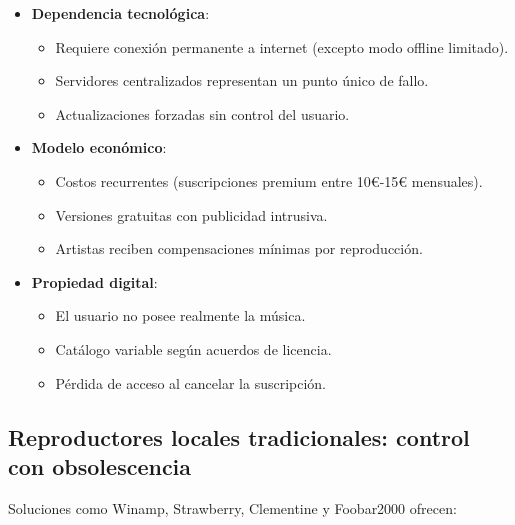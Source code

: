 \documentclass[11pt, a4paper]{article}
\begin{document}
  \begin{itemize}
      \item \textbf{Dependencia tecnológica}:
      \begin{itemize}
          \item Requiere conexión permanente a internet (excepto modo offline limitado).
          \item Servidores centralizados representan un punto único de fallo.
          \item Actualizaciones forzadas sin control del usuario.
      \end{itemize}
      
      \item \textbf{Modelo económico}:
      \begin{itemize}
          \item Costos recurrentes (suscripciones premium entre 10€-15€ mensuales).
          \item Versiones gratuitas con publicidad intrusiva.
          \item Artistas reciben compensaciones mínimas por reproducción.
      \end{itemize}
      
      \item \textbf{Propiedad digital}:
      \begin{itemize}
          \item El usuario no posee realmente la música.
          \item Catálogo variable según acuerdos de licencia.
          \item Pérdida de acceso al cancelar la suscripción.
      \end{itemize}
  \end{itemize}

  \subsection{Reproductores locales tradicionales: control con obsolescencia}

  Soluciones como Winamp, Strawberry, Clementine y Foobar2000 ofrecen:
\end{document}

